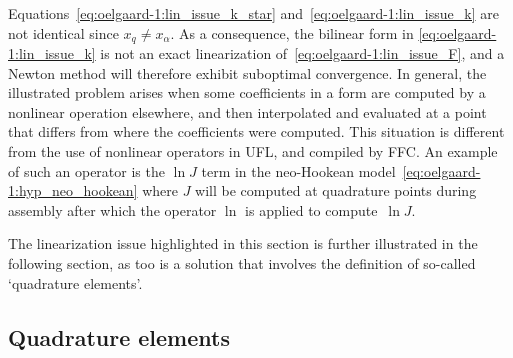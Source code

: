 Equations~\eqref{eq:oelgaard-1:lin_issue_k_star}
and~\eqref{eq:oelgaard-1:lin_issue_k} are not identical since
$x_{q} \neq x_{\alpha}$. As a consequence, the bilinear form in
\eqref{eq:oelgaard-1:lin_issue_k} is not an exact linearization
of~\eqref{eq:oelgaard-1:lin_issue_F}, and a Newton method will therefore
exhibit suboptimal convergence.  In general, the illustrated problem
arises when some coefficients in a form are computed by a nonlinear
operation elsewhere, and then interpolated and evaluated at a point
that differs from where the coefficients were computed. This situation
is different from the use of nonlinear operators in UFL, and compiled
by FFC. An example of such an operator is the $\ln J$ term in the neo-Hookean
model~\eqref{eq:oelgaard-1:hyp_neo_hookean} where $J$ will be computed
at quadrature points during assembly after which the operator $\ln$ is applied
to compute~$\ln J$.

The linearization issue highlighted in this section is further illustrated
in the following section, as too is a solution that involves the
definition of so-called `quadrature elements'.

\subsection{Quadrature elements}

